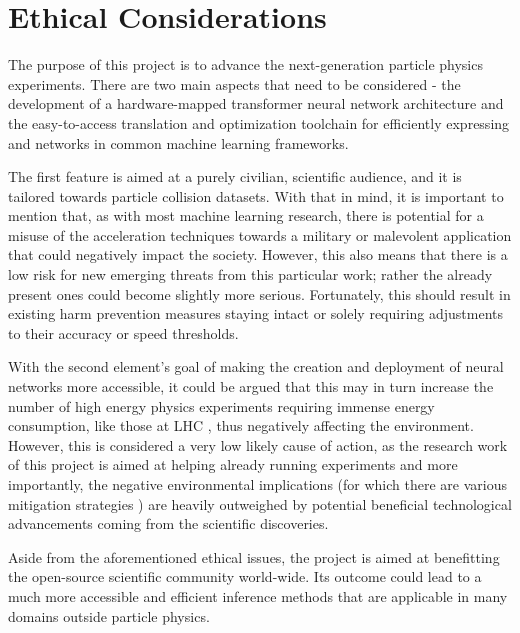 \section{Ethical Considerations}\label{ethical}

The purpose of this project is to advance the next-generation particle physics experiments. There are two main aspects that need to be considered - the development of a hardware-mapped transformer neural network architecture and the easy-to-access translation and optimization toolchain for efficiently expressing and networks in common machine learning frameworks.  

The first feature is aimed at a purely civilian, scientific audience, and it is tailored towards particle collision datasets. With that in mind, it is important to mention that, as with most machine learning research, there is potential for a misuse of the acceleration techniques towards a military or malevolent application that could negatively impact the society. However, this also means that there is a low risk for new emerging threats from this particular work; rather the already present ones could become slightly more serious. Fortunately, this should result in existing harm prevention measures staying intact or solely requiring adjustments to their accuracy or speed thresholds.

With the second element's goal of making the creation and deployment of neural networks more accessible, it could be argued that this may in turn increase the number of high energy physics experiments requiring immense energy consumption, like those at LHC \cite{1-cernfacts}, thus negatively affecting the environment. However, this is considered a very low likely cause of action, as the research work of this project is aimed at helping already running experiments and more importantly, the negative environmental implications (for which there are various mitigation strategies \cite{Guida_2016, 2-capeans2017strategies}) are heavily outweighed by potential beneficial technological advancements coming from the scientific discoveries.

Aside from the aforementioned ethical issues, the project is aimed at benefitting the open-source scientific community world-wide. Its outcome could lead to a much more accessible and efficient inference methods that are applicable in many domains outside particle physics.